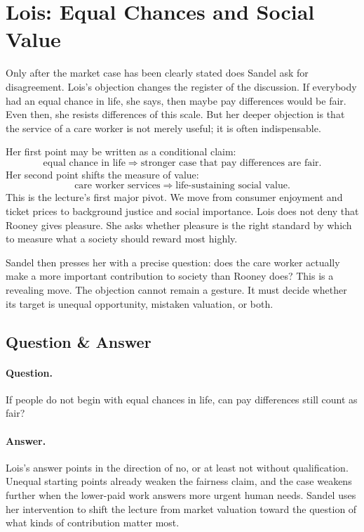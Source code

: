 \section{Lois: Equal Chances and Social Value}

Only after the market case has been clearly stated does Sandel ask for disagreement. Lois's objection changes the register of the discussion. If everybody had an equal chance in life, she says, then maybe pay differences would be fair. Even then, she resists differences of this scale. But her deeper objection is that the service of a care worker is not merely useful; it is often indispensable.

Her first point may be written as a conditional claim:
\begin{equation}
\text{equal chance in life}
\Longrightarrow
\text{stronger case that pay differences are fair}.
\end{equation}
Her second point shifts the measure of value:
\begin{equation}
\text{care worker services}
\Longrightarrow
\text{life-sustaining social value}.
\end{equation}
This is the lecture's first major pivot. We move from consumer enjoyment and ticket prices to background justice and social importance. Lois does not deny that Rooney gives pleasure. She asks whether pleasure is the right standard by which to measure what a society should reward most highly.

Sandel then presses her with a precise question: does the care worker actually make a more important contribution to society than Rooney does? This is a revealing move. The objection cannot remain a gesture. It must decide whether its target is unequal opportunity, mistaken valuation, or both.

\subsection{Question \& Answer}

\paragraph{Question.} If people do not begin with equal chances in life, can pay differences still count as fair?

\paragraph{Answer.} Lois's answer points in the direction of no, or at least not without qualification. Unequal starting points already weaken the fairness claim, and the case weakens further when the lower-paid work answers more urgent human needs. Sandel uses her intervention to shift the lecture from market valuation toward the question of what kinds of contribution matter most.

